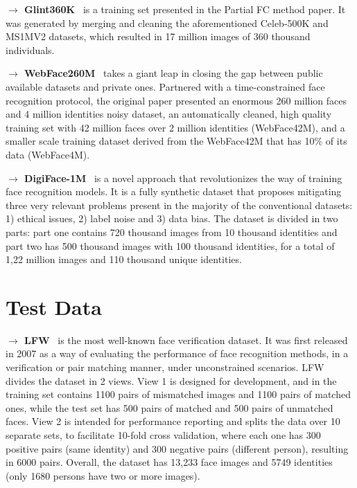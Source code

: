 \documentclass[class=report, crop=false, a4paper, 12pt]{standalone}
\begin{document}
\vspace{0.7\baselineskip}
\noindent\textbf{$\rightarrow$ Glint360K}~\autocite{anPartialFCTraining2021} is a training set presented in the Partial FC method paper. It was generated by merging and cleaning the aforementioned Celeb-500K and MS1MV2 datasets, which resulted in 17 million images of 360 thousand individuals.

\vspace{0.7\baselineskip}
\noindent\textbf{$\rightarrow$ WebFace260M}~\autocite{zhuWebFace260MBenchmarkUnveiling2021} takes a giant leap in closing the gap between public available datasets and private ones. Partnered with a time-constrained face recognition protocol, the original paper presented an enormous 260 million faces and 4 million identities noisy dataset, an automatically cleaned, high quality training set with 42 million faces over 2 million identities (WebFace42M), and a smaller scale training dataset derived from the WebFace42M that has 10\% of its data (WebFace4M).

\vspace{0.7\baselineskip}
\noindent\textbf{$\rightarrow$ DigiFace-1M}~\autocite{baeDigiFace1MMillionDigital2023} is a novel approach that revolutionizes the way of training face recognition models. It is a fully synthetic dataset that proposes mitigating three very relevant problems present in the majority of the conventional datasets: 1) ethical issues, 2) label noise and 3) data bias. The dataset is divided in two parts: part one contains 720 thousand images from 10 thousand identities and part two has 500 thousand images with 100 thousand identities, for a total of 1,22 million images and 110 thousand unique identities.


\section*{Test Data}\label{sec:test_data_appendix}
\noindent\textbf{$\rightarrow$ LFW}~\autocite{huangLabeledFacesWild} is the most well-known face verification dataset. It was first released in 2007 as a way of evaluating the performance of face recognition methods, in a verification or pair matching manner, under unconstrained scenarios. LFW divides the dataset in 2 views. View 1 is designed for development, and in the training set contains 1100 pairs of mismatched images and 1100 pairs of matched ones, while the test set has 500 pairs of matched and 500 pairs of unmatched faces. View 2 is intended for performance reporting and splits the data over 10 separate sets, to facilitate 10-fold cross validation, where each one has 300 positive pairs (same identity) and 300 negative pairs (different person), resulting in 6000 pairs. Overall, the dataset has 13,233 face images and 5749 identities (only 1680 persons have two or more images).
\end{document}
